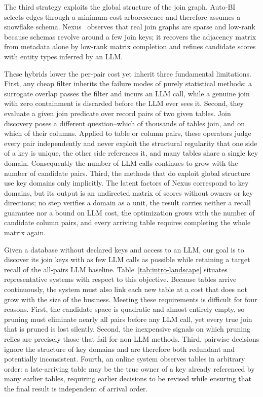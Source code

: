 The third strategy exploits the global structure of the join graph. Auto-BI~\cite{AutoBI} selects edges through a minimum-cost arborescence and therefore assumes a snowflake schema. Nexus~\cite{Nexus} observes that real join graphs are sparse and low-rank because schemas revolve around a few join keys; it recovers the adjacency matrix from metadata alone by low-rank matrix completion and refines candidate scores with entity types inferred by an LLM.

These hybrids lower the per-pair cost yet inherit three fundamental limitations. First, any cheap filter inherits the failure modes of purely statistical methods: a surrogate overlap passes the filter and incurs an LLM call, while a genuine join with zero containment is discarded before the LLM ever sees it. Second, they evaluate a given join predicate over record pairs of two given tables. Join discovery poses a different question--which of thousands of tables join, and on which of their columns. Applied to table or column pairs, these operators judge every pair independently and never exploit the structural regularity that one side of a key is unique, the other side references it, and many tables share a single key domain. Consequently the number of LLM calls continues to grow with the number of candidate pairs. Third, the methods that do exploit global structure use key domains only implicitly. The latent factors of Nexus correspond to key domains, but its output is an undirected matrix of scores without owners or key directions; no step verifies a domain as a unit, the result carries neither a recall guarantee nor a bound on LLM cost, the optimization grows with the number of candidate column pairs, and every arriving table requires completing the whole matrix again.



Given a database without declared keys and access to an LLM, our goal is to discover its join keys with as few LLM calls as possible while retaining a target recall of the all-pairs LLM baseline. Table~\ref{tab:intro-landscape} situates representative systems with respect to this objective. Because tables arrive continuously, the system must also link each new table at a cost that does not grow with the size of the business. Meeting these requirements is difficult for four reasons. First, the candidate space is quadratic and almost entirely empty, so pruning must eliminate nearly all pairs before any LLM call, yet every true join that is pruned is lost silently. Second, the inexpensive signals on which pruning relies are precisely those that fail for non-LLM methods. Third, pairwise decisions ignore the structure of key domains and are therefore both redundant and potentially inconsistent. Fourth, an online system observes tables in arbitrary order: a late-arriving table may be the true owner of a key already referenced by many earlier tables, requiring earlier decisions to be revised while ensuring that the final result is independent of arrival order.


